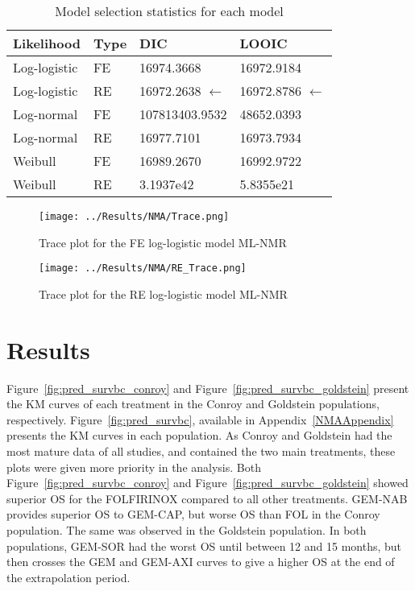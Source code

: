 \begin{table}[h]
    \centering
    \begin{tabular}{llll}
    \hline
    Likelihood   & Type & DIC         & LOOIC      \\ \hline
    Log-logistic & FE  & 16974.3668  & 16972.9184 \\
    Log-logistic & RE & 16972.2638  $\leftarrow$ & 16972.8786 $\leftarrow$ \\
    Log-normal   & FE  & 107813403.9532  & 48652.0393 \\
    Log-normal   & RE & 16977.7101  & 16973.7934 \\
    Weibull      & FE  & 16989.2670 & 16992.9722 \\
    Weibull      & RE & 3.1937e42 & 5.8355e21 \\ \hline
    \end{tabular}
    \caption{Model selection statistics for each model}
    \label{tab:selectionstatbc}
\end{table}

\begin{figure}[h]
    \centering
    \begin{minipage}[b]{0.45\textwidth}
        \centering
        \texttt{[image: ../Results/NMA/Trace.png]}
        \caption{Trace plot for the FE log-logistic model ML-NMR}
        \label{fig:tracebcFE}
    \end{minipage}
    \hspace{0.05\textwidth}
    \begin{minipage}[b]{0.45\textwidth}
        \centering
        \texttt{[image: ../Results/NMA/RE\_Trace.png]}
        \caption{Trace plot for the RE log-logistic model ML-NMR}
        \label{fig:tracebcRE}
    \end{minipage}
\end{figure}

\section{Results}
Figure~\ref{fig:pred_survbc_conroy} and Figure~\ref{fig:pred_survbc_goldstein} present the KM curves of each treatment in the Conroy and Goldstein populations, respectively. Figure~\ref{fig:pred_survbc}, available in Appendix~\ref{NMAAppendix} presents the KM curves in each population. As Conroy and Goldstein had the most mature data of all studies, and contained the two main treatments, these plots were given more priority in the analysis. Both Figure~\ref{fig:pred_survbc_conroy} and Figure~\ref{fig:pred_survbc_goldstein} showed superior OS for the FOLFIRINOX compared to all other treatments. GEM-NAB provides superior OS to GEM-CAP, but worse OS than FOL in the Conroy population. The same was observed in the Goldstein population. In both populations, GEM-SOR had the worst OS until between 12 and 15 months, but then crosses the GEM and GEM-AXI curves to give a higher OS at the end of the extrapolation period. \\

